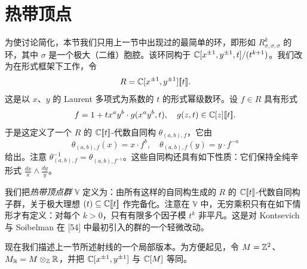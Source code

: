 \section{热带顶点}

为使讨论简化，本节我们只用上一节中出现过的最简单的环，即形如 $R^k_{\sigma,\sigma,\sigma}$ 的环，其中 $\sigma$ 是一个极大（二维）胞腔。该环同构于 $\mathbb{C}[x^{\pm1},y^{\pm1},t]/(t^{k+1})$。我们改为在形式框架下工作，令
\[
R=\mathbb{C}[x^{\pm1},y^{\pm1}][\![t]\!].
\]
这是以 $x$、$y$ 的 Laurent 多项式为系数的 $t$ 的形式幂级数环。设 $f\in R$ 具有形式
\[
f=1+tx^ay^b\cdot g(x^ay^b,t),\quad g(z,t)\in\mathbb{C}[z][\![t]\!].
\]
于是这定义了一个 $R$ 的 $\mathbb{C}[\![t]\!]$-代数自同构 $\theta_{(a,b),f}$，它由
\[
\theta_{(a,b),f}(x)=x\cdot f^b,\quad \theta_{(a,b),f}(y)=y\cdot f^{-a}
\]
给出。注意 $\theta_{(a,b),f}^{-1}=\theta_{(a,b),f^{-1}}$。这些自同构还具有如下性质：它们保持全纯辛形式 $\frac{dx}{x}\wedge\frac{dy}{y}$。

我们把\emph{热带顶点群} $\mathbb{V}$ 定义为：由所有这样的自同构生成的 $R$ 的 $\mathbb{C}[\![t]\!]$-代数自同构子群，关于极大理想 $(t)\subseteq\mathbb{C}[\![t]\!]$ 作完备化。注意在 $\mathbb{V}$ 中，无穷乘积只有在如下情形才有定义：对每个 $k>0$，只有有限多个因子模 $t^k$ 非平凡。这是对 Kontsevich 与 Soibelman 在 [54] 中最初引入的群的一个轻微改动。

现在我们描述上一节所述射线的一个局部版本。为方便起见，令 $M=\mathbb{Z}^2$、$M_{\mathbb{R}}=M\otimes_{\mathbb{Z}}\mathbb{R}$，并把 $\mathbb{C}[x^{\pm1},y^{\pm1}]$ 与 $\mathbb{C}[M]$ 等同。

